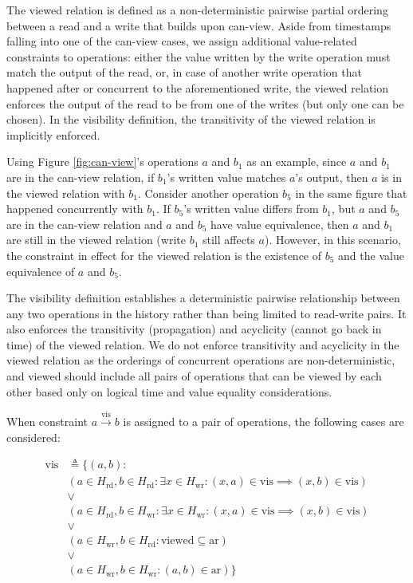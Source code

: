 The viewed relation is defined as a non-deterministic
pairwise partial ordering
between a read and a write that builds upon can-view. Aside from timestamps
falling into one of the can-view cases, we
assign additional value-related
constraints to operations: either the value written by the write
operation must match the output
of the read, or, in case of another write operation
that happened after or
concurrent to the
aforementioned write, the viewed relation enforces the
output of the read to be
from one of the writes (but only one can be chosen). In
the visibility definition, the
transitivity of the viewed relation is implicitly enforced.

Using Figure \ref{fig:can-view}'s operations $a$ and $b_1$ as an example,
since $a$ and $b_1$ are in the can-view relation, if
$b_1$'s written
value matches $a$'s output, then $a$ is in
the viewed relation with $b_1$. Consider
another operation $b_5$ in the same figure that happened
concurrently with $b_1$.
If $b_5$'s written value differs
from $b_1$, but $a$ and $b_5$ are in the can-view
relation and $a$ and
$b_5$ have value
equivalence, then $a$ and $b_1$ are still in the viewed
relation (write
$b_1$ still affects $a$).
However, in this scenario, the constraint in effect for the viewed
relation is the existence of $b_5$ and
the value equivalence of $a$ and $b_5$.

The visibility definition establishes a deterministic pairwise
relationship between any two operations in the history
rather than being
limited to read-write pairs.
It also enforces the transitivity (propagation) and acyclicity
(cannot go back in time) of the viewed
relation. We do not enforce transitivity and acyclicity in the viewed relation
as the orderings of concurrent operations are non-deterministic, and viewed
should include all pairs of operations that can be viewed by each
other based only on logical time and value equality considerations.

When constraint $a \xrightarrow{\text{vis}} b$ is
assigned to a pair
of operations,
the following cases are considered:

\begin{align*}
  \text{vis} &\triangleq \{(a, b) : \\
    &(a \in H_\text{rd}, b \in H_\text{rd} : \exists x \in
    H_\text{wr}: (x, a) \in \text{vis} \implies (x, b) \in \text{vis}) \\
    &\lor \\
    &(a \in H_\text{rd}, b \in H_\text{wr} : \exists x \in
    H_\text{wr}: (x, a) \in \text{vis} \implies (x, b) \in \text{vis}) \\
    &\lor \\
    &(a \in H_\text{wr}, b \in H_\text{rd} : \text{viewed} \subseteq
    \text{ar}) \\
    &\lor \\
  &(a \in H_\text{wr}, b \in H_\text{wr} : (a, b) \in \text{ar})\}
\end{align*}

